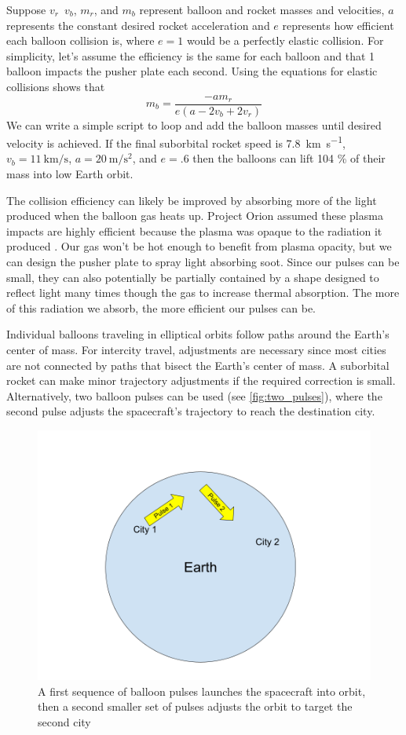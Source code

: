 \documentclass{article}
\begin{document}
Suppose \(v_r\)\,  \(v_b\),  \(m_r\), and \(m_b\) represent balloon and rocket masses and velocities,    \(a\) represents the constant desired rocket acceleration and \(e\) represents how efficient each balloon collision is, where \(e=1\) would be a perfectly elastic collision.   For simplicity, let's assume the efficiency is the same for each balloon and that 1 balloon impacts the pusher plate each second.   Using the equations for elastic collisions shows that 
\begin{equation}
m_b=\frac{-am_r}{e(a - 2v_b + 2v_r)}
\label{eq:balloon_mass}
\end{equation}
We can write a simple script \cite{balloon_mass_script} to loop and add the balloon masses until desired velocity is achieved.   If the final suborbital rocket speed is \SI{7.8}{\kilo\metre\per\second}, \(v_b=\SI{11}{\kilo\metre\per\second}\), \(a=\SI{20}{\metre\per\second\squared}\), and \(e=.6\) then the balloons can lift 104 \% of their mass into low Earth orbit.   

The collision efficiency can likely be improved by absorbing more of the light produced when the balloon gas heats up.   Project Orion assumed these plasma impacts are highly efficient because the plasma was opaque to the radiation it produced \cite{orion_reflections}.  Our gas won't be hot enough to benefit from plasma opacity, but we can design the pusher plate to spray light absorbing soot.   Since our pulses can be small, they can also potentially be partially contained by a shape designed to reflect light many times though the gas to increase thermal absorption.   The more of this radiation we absorb, the more efficient our pulses can be.  

Individual balloons traveling in elliptical orbits follow paths around the Earth’s center of mass. For intercity travel, adjustments are necessary since most cities are not connected by paths that bisect the Earth’s center of mass. A suborbital rocket can make minor trajectory adjustments if the required correction is small. Alternatively, two balloon pulses can be used (see \autoref{fig:two_pulses}), where the second pulse adjusts the spacecraft’s trajectory to reach the destination city.

\begin{figure}
    \centering
    \includegraphics[width=0.5\linewidth]{images/Two Pulses.png}
    \caption{A first sequence of balloon pulses launches the spacecraft into orbit, then a second smaller set of pulses adjusts the orbit to target the second city}
    \label{fig:two_pulses}
\end{figure}
\end{document}
